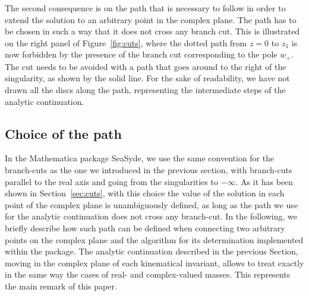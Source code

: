 The second consequence is on the path that is necessary to follow in order to extend the solution to an arbitrary point in the complex plane. The path has to be chosen in such a way that it does not cross any branch cut. This is illustrated on the right panel of Figure~\ref{fig:cuts}, where the dotted path from $z=0$ to $z_1$ is now forbidden by the presence of the branch cut corresponding to the pole $w_+$. The cut needs to be avoided with a path that goes around to the right of the singularity, as shown by the solid line. For the sake of readability, we have not drawn all the discs along the path, representing the intermediate steps of the analytic continuation.

\subsection{Choice of the path}
\label{subsec:path}
In the {\sc Mathematica} package {\sc SeaSyde}, we use the same convention for the branch-cuts as the one we introduced in the previous section, with branch-cuts parallel to the real axis and going from the singularities to $-\infty$.
As it has been shown in Section~\ref{sec:cuts}, with this choice the value of the solution in each point of the complex plane is unambiguously defined, as long as the path we use for the analytic continuation does not cross any branch-cut.
In the following, we briefly describe how such path can be defined when connecting two arbitrary points on the complex plane and the algorithm for its determination implemented within the package.
The analytic continuation described in the previous Section, moving in the complex plane of each kinematical invariant, allows to treat exactly in the same way the cases of real- and complex-valued masses. This represents the main remark of this paper.
